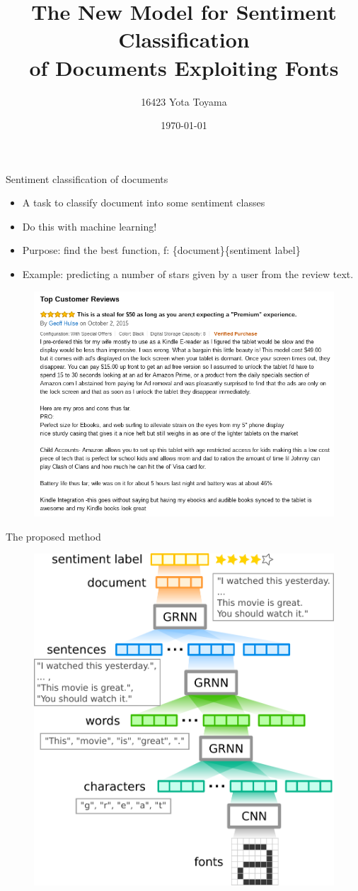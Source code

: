 \documentclass[aspectratio=43,unicode,10pt]{beamer}
\title[font2char2word2sent2doc]{
  The New Model for Sentiment Classification \\
  of Documents Exploiting Fonts}
\institute[CoIn Lab., TTI]{Computational Intelligence Laboratory, \\
                      Toyota Technological Institute}
\author{16423 Yota Toyama}
\date{\today}
\newcommand{\set}[1]{\{#1\}}
\begin{document}
\begin{frame}
\titlepage
\end{frame}

\begin{frame}{Sentiment classification of documents}
  \begin{itemize}
    \item A task to classify document into some sentiment classes
    \item Do this with machine learning!
    \item Purpose: find the best function,
          f: \set{document}\rightarrow\set{sentiment label}
    \item Example: predicting a number of stars given by a user
                   from the review text.
  \end{itemize}
  \begin{figure}
    \includegraphics[width=0.6\linewidth]{fig/review.png}
  \end{figure}
\end{frame}

\begin{frame}{The proposed method}
  \begin{figure}
    \includegraphics[width=0.6\linewidth]{fig/fcwsd.pdf}
  \end{figure}
\end{frame}
\end{document}

